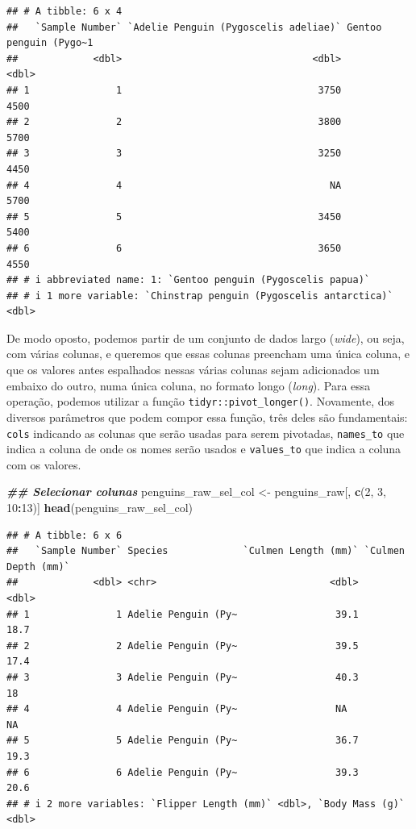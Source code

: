 \documentclass[
]{article}
\newenvironment{Shaded}{\begin{snugshade}}{\end{snugshade}}
\newcommand{\DecValTok}[1]{\textcolor[rgb]{0.00,0.00,0.81}{#1}}
\newcommand{\DocumentationTok}[1]{\textcolor[rgb]{0.56,0.35,0.01}{\textbf{\textit{#1}}}}
\newcommand{\FunctionTok}[1]{\textcolor[rgb]{0.13,0.29,0.53}{\textbf{#1}}}
\newcommand{\NormalTok}[1]{#1}
\newcommand{\OtherTok}[1]{\textcolor[rgb]{0.56,0.35,0.01}{#1}}
\newcommand{\SpecialCharTok}[1]{\textcolor[rgb]{0.81,0.36,0.00}{\textbf{#1}}}
\begin{document}
\begin{verbatim}
## # A tibble: 6 x 4
##   `Sample Number` `Adelie Penguin (Pygoscelis adeliae)` Gentoo penguin (Pygo~1
##             <dbl>                                 <dbl>                  <dbl>
## 1               1                                  3750                   4500
## 2               2                                  3800                   5700
## 3               3                                  3250                   4450
## 4               4                                    NA                   5700
## 5               5                                  3450                   5400
## 6               6                                  3650                   4550
## # i abbreviated name: 1: `Gentoo penguin (Pygoscelis papua)`
## # i 1 more variable: `Chinstrap penguin (Pygoscelis antarctica)` <dbl>
\end{verbatim}

De modo oposto, podemos partir de um conjunto de dados largo (\emph{wide}), ou seja, com várias colunas, e queremos que essas colunas preencham uma única coluna, e que os valores antes espalhados nessas várias colunas sejam adicionados um embaixo do outro, numa única coluna, no formato longo (\emph{long}). Para essa operação, podemos utilizar a função \texttt{tidyr::pivot\_longer()}. Novamente, dos diversos parâmetros que podem compor essa função, três deles são fundamentais: \texttt{cols} indicando as colunas que serão usadas para serem pivotadas, \texttt{names\_to} que indica a coluna de onde os nomes serão usados e \texttt{values\_to} que indica a coluna com os valores.

\begin{Shaded}
\begin{Highlighting}[]
\DocumentationTok{\#\# Selecionar colunas}
\NormalTok{penguins\_raw\_sel\_col }\OtherTok{\textless{}{-}}\NormalTok{ penguins\_raw[, }\FunctionTok{c}\NormalTok{(}\DecValTok{2}\NormalTok{, }\DecValTok{3}\NormalTok{, }\DecValTok{10}\SpecialCharTok{:}\DecValTok{13}\NormalTok{)]}
\FunctionTok{head}\NormalTok{(penguins\_raw\_sel\_col)}
\end{Highlighting}
\end{Shaded}

\begin{verbatim}
## # A tibble: 6 x 6
##   `Sample Number` Species             `Culmen Length (mm)` `Culmen Depth (mm)`
##             <dbl> <chr>                              <dbl>               <dbl>
## 1               1 Adelie Penguin (Py~                 39.1                18.7
## 2               2 Adelie Penguin (Py~                 39.5                17.4
## 3               3 Adelie Penguin (Py~                 40.3                18  
## 4               4 Adelie Penguin (Py~                 NA                  NA  
## 5               5 Adelie Penguin (Py~                 36.7                19.3
## 6               6 Adelie Penguin (Py~                 39.3                20.6
## # i 2 more variables: `Flipper Length (mm)` <dbl>, `Body Mass (g)` <dbl>
\end{verbatim}
\end{document}
